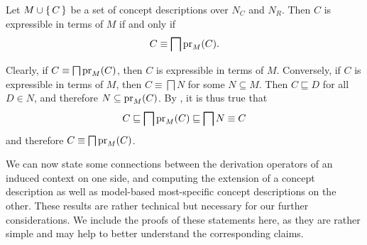 \begin{Lemma}
  \label{lem:characterizing-expressible-in-terms-of}
  Let $M \cup {\ensuremath{\{\,C\,\}}}$ be a set of concept descriptions over $N_C$ and $N_R$.  Then $C$ is
  expressible in terms of $M$ if and only if
  \begin{equation*}
    C \equiv \bigsqcap \operatorname{pr}_M(C).
  \end{equation*}
\end{Lemma}
\begin{Proof}
  Clearly, if $C \equiv \bigsqcap \operatorname{pr}_M(C)$, then $C$ is expressible in terms of $M$.
  Conversely, if $C$ is expressible in terms of $M$, then $C \equiv \bigsqcap N$ for some
  $N \subseteq M$.  Then $C \sqsubseteq D$ for all $D \in N$, and therefore $N \subseteq
  \operatorname{pr}_M(C)$.  By , it is thus true that
  \begin{equation*}
    C \sqsubseteq \bigsqcap \operatorname{pr}_M(C) \sqsubseteq \bigsqcap N \equiv C
  \end{equation*}
  and therefore $C \equiv \bigsqcap \operatorname{pr}_M(C)$.
\end{Proof}

We can now state some connections between the derivation operators of an induced context
on one side, and computing the extension of a concept description as well as model-based
most-specific concept descriptions on the other.  These results are rather technical but
necessary for our further considerations.  We include the proofs of these statements here,
as they are rather simple and may help to better understand the corresponding claims.

